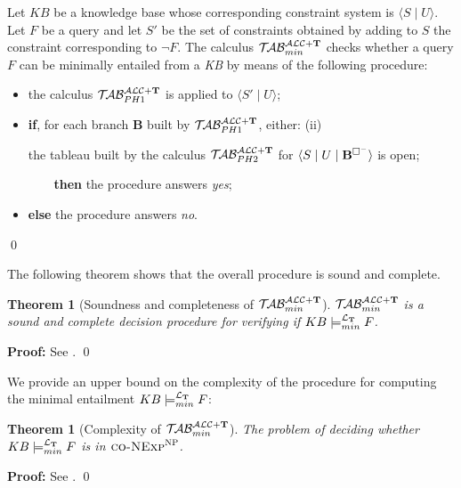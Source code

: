 \documentclass[a4paper, 11pt, oneside]{duthesis}
\newcommand{\tip}{{\bf T}}
\newcommand{\nott} {\lnot}
\newcommand{\tc} {\mid}
\newcommand{\bbox}{\square}
\newcommand{\sx} {\langle}
\newcommand{\dx} {\rangle}
\newcommand{\ellet} {\mathcal{L}_{\bf T}}
\newcommand{\nuovoc}{\mathrel{{\mathcal{T}\!\mathcal{AB}}}_{min}^{\mathcal{ALC}+\mbox{\scriptsize $\tip$}}}
\newcommand{\primo}{\mathrel{{\mathcal{T}\!\mathcal{AB}}}_{PH 1}^{\mathcal{ALC}+\mbox{\scriptsize $\tip$}}}
\newcommand{\secondo}{\mathrel{{\mathcal{T}\!\mathcal{AB}}}_{PH 2}^{\mathcal{ALC}+\mbox{\scriptsize $\tip$}}}
\newenvironment{proof}
{\begin{trivlist} \item[] {\bf Proof:}}%
{\qed \end{trivlist}}
\newenvironment{definition}
{\begin{defi} \rm}{\qed \end{defi}}
\newenvironment{proof}
{\begin{trivlist} \item[] {\bf Proof:}}%
{\qed \end{trivlist}}
\newenvironment{definition}
{\begin{defi} \rm}{\qed \end{defi}}
\newtheorem{theorem}{Theorem}
\newtheorem{definition}{Definition}
\newcounter{posu}
\newtheorem{theorem}[posu]{Theorem}
\newtheorem{definition}[posu]{Definition}
\newtheorem{proof}[posu]{Proof}
\begin{document}
\begin{definition}\label{def processo}
Let $KB$ be a knowledge base whose corresponding constraint system is $\sx S \tc U \dx$. Let $F$ be a query and let $S'$ be the set of constraints obtained by adding to $S$ the constraint corresponding to $\nott F$.
The calculus $\nuovoc$ checks whether a query $F$ can be minimally entailed from a \emph{KB} by means of the following procedure:
\begin{itemize}
\item the calculus $\primo$ is applied to $\sx S' \tc U \dx$;
\item \textbf{if}, for each branch {\bf B} built by $\primo$, either:
	\subitem(ii) {the tableau built by the calculus $\secondo$ for $\sx S \tc U \tc {\bf
B}^{\bbox^{-}} \dx$ is open;

\verb$    $\textbf{then} the procedure answers \emph{yes};}
\item[] \textbf{else} the procedure answers \emph{no}.
\end{itemize}
\end{definition}

\noindent The following theorem shows that the overall procedure is sound and complete.

\begin{theorem}[Soundness and completeness of $\nuovoc$]\label{Soundness e completeness nuovoc} $\nuovoc$ is  a sound and complete decision procedure for verifying if $KB \models_{min}^{\ellet} F$.
\end{theorem}

\begin{proof}
See \cite{Giordano:2013:NDL:2435476.2435957}.
\end{proof}

We provide an upper bound on the complexity of the procedure for computing the minimal entailment $KB \models_{min}^{\ellet} F$:

\begin{theorem}[Complexity of $\nuovoc$]\label{overall_complexity}
The problem of deciding whether $KB \models_{min}^{\ellet} F$ is in $\textsc{co-NExp}^\textsc{NP}$.
\end{theorem}

\begin{proof}
See \cite{Giordano:2013:NDL:2435476.2435957}.
\end{proof}

\newpage


\end{document}
